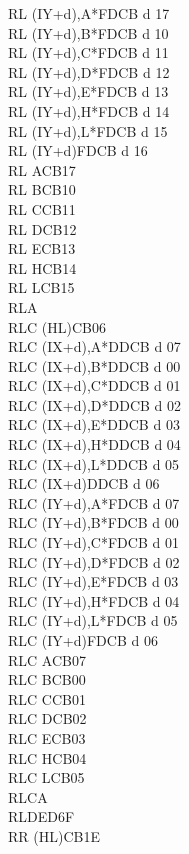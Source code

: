 \documentclass[oneside,a4paper]{book}
\begin{document}
\begin{multicols}{3}
{\begin{tabbing}
RL (IY+d),A*\>FDCB d 17\\
RL (IY+d),B*\>FDCB d 10\\
RL (IY+d),C*\>FDCB d 11\\
RL (IY+d),D*\>FDCB d 12\\
RL (IY+d),E*\>FDCB d 13\\
RL (IY+d),H*\>FDCB d 14\\
RL (IY+d),L*\>FDCB d 15\\
RL (IY+d)\>FDCB d 16\\
RL A\>CB17\\
RL B\>CB10\\
RL C\>CB11\\
RL D\>CB12\\
RL E\>CB13\\
RL H\>CB14\\
RL L\>CB15\\
RLA\\
RLC (HL)\>CB06\\
RLC (IX+d),A*\>DDCB d 07\\
RLC (IX+d),B*\>DDCB d 00\\
RLC (IX+d),C*\>DDCB d 01\\
RLC (IX+d),D*\>DDCB d 02\\
RLC (IX+d),E*\>DDCB d 03\\
RLC (IX+d),H*\>DDCB d 04\\
RLC (IX+d),L*\>DDCB d 05\\
RLC (IX+d)\>DDCB d 06\\
RLC (IY+d),A*\>FDCB d 07\\
RLC (IY+d),B*\>FDCB d 00\\
RLC (IY+d),C*\>FDCB d 01\\
RLC (IY+d),D*\>FDCB d 02\\
RLC (IY+d),E*\>FDCB d 03\\
RLC (IY+d),H*\>FDCB d 04\\
RLC (IY+d),L*\>FDCB d 05\\
RLC (IY+d)\>FDCB d 06\\
RLC A\>CB07\\
RLC B\>CB00\\
RLC C\>CB01\\
RLC D\>CB02\\
RLC E\>CB03\\
RLC H\>CB04\\
RLC L\>CB05\\
RLCA\\
RLD\>ED6F\\
RR (HL)\>CB1E\\

\end{tabbing}}
\end{multicols}
\end{document}
